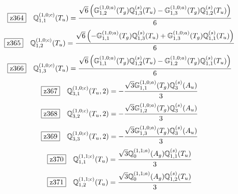 \documentclass[fleqn,10pt,landscape]{jsarticle}
\begin{document}
\begin{dmath*}
\hspace*{3mm}\fbox{z364}\quad \mathbb{Q}_{1,1}^{(1,0;c)}(T_{u})=\frac{\sqrt{6} \left(\mathbb{G}_{1,2}^{(1,0;a)}(T_{g}) \mathbb{Q}_{1,3}^{(s)}(T_{u}) - \mathbb{G}_{1,3}^{(1,0;a)}(T_{g}) \mathbb{Q}_{1,2}^{(s)}(T_{u})\right)}{6}
\end{dmath*}
\begin{dmath*}
\hspace*{3mm}\fbox{z365}\quad \mathbb{Q}_{1,2}^{(1,0;c)}(T_{u})=\frac{\sqrt{6} \left(- \mathbb{G}_{1,1}^{(1,0;a)}(T_{g}) \mathbb{Q}_{1,3}^{(s)}(T_{u}) + \mathbb{G}_{1,3}^{(1,0;a)}(T_{g}) \mathbb{Q}_{1,1}^{(s)}(T_{u})\right)}{6}
\end{dmath*}
\begin{dmath*}
\hspace*{3mm}\fbox{z366}\quad \mathbb{Q}_{1,3}^{(1,0;c)}(T_{u})=\frac{\sqrt{6} \left(\mathbb{G}_{1,1}^{(1,0;a)}(T_{g}) \mathbb{Q}_{1,2}^{(s)}(T_{u}) - \mathbb{G}_{1,2}^{(1,0;a)}(T_{g}) \mathbb{Q}_{1,1}^{(s)}(T_{u})\right)}{6}
\end{dmath*}
\begin{dmath*}
\hspace*{3mm}\fbox{z367}\quad \mathbb{Q}_{3,1}^{(1,0;c)}(T_{u},2)=- \frac{\sqrt{3} \mathbb{G}_{1,1}^{(1,0;a)}(T_{g}) \mathbb{Q}_{3}^{(s)}(A_{u})}{3}
\end{dmath*}
\begin{dmath*}
\hspace*{3mm}\fbox{z368}\quad \mathbb{Q}_{3,2}^{(1,0;c)}(T_{u},2)=- \frac{\sqrt{3} \mathbb{G}_{1,2}^{(1,0;a)}(T_{g}) \mathbb{Q}_{3}^{(s)}(A_{u})}{3}
\end{dmath*}
\begin{dmath*}
\hspace*{3mm}\fbox{z369}\quad \mathbb{Q}_{3,3}^{(1,0;c)}(T_{u},2)=- \frac{\sqrt{3} \mathbb{G}_{1,3}^{(1,0;a)}(T_{g}) \mathbb{Q}_{3}^{(s)}(A_{u})}{3}
\end{dmath*}
\begin{dmath*}
\hspace*{3mm}\fbox{z370}\quad \mathbb{Q}_{1,1}^{(1,1;c)}(T_{u})=\frac{\sqrt{3} \mathbb{Q}_{0}^{(1,1;a)}(A_{g}) \mathbb{Q}_{1,1}^{(s)}(T_{u})}{3}
\end{dmath*}
\begin{dmath*}
\hspace*{3mm}\fbox{z371}\quad \mathbb{Q}_{1,2}^{(1,1;c)}(T_{u})=\frac{\sqrt{3} \mathbb{Q}_{0}^{(1,1;a)}(A_{g}) \mathbb{Q}_{1,2}^{(s)}(T_{u})}{3}
\end{dmath*}
\end{document}
